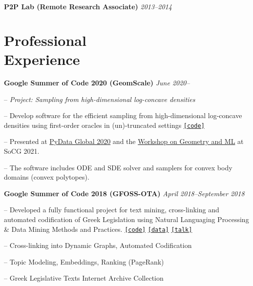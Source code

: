 \documentclass[margin, 10pt]{res}
\newcommand{\field}[2]{\noindent \textbf{#1} \hfill #2 \\}
\newcommand{\specialurl}[2]{\href { #2 } {\nolinkurl{[#1]}}}
\newcommand{\code}[1]{\specialurl {code} {#1}}
\newcommand{\data}[1]{\specialurl {data} {#1}}
\newcommand{\talk}[1]{\specialurl {talk} {#1}}
\begin{document}
\begin{resume}
\textbf{P2P Lab (Remote Research Associate)} \hfill \emph{2013--2014}


 
\section{Professional \\ Experience}
\field{Google Summer of Code 2020 (GeomScale)}  {\emph{June 2020--}}
\begin{compactitem}
\item[--] \emph{Project: Sampling from high-dimensional log-concave densities} 
\item[--] Develop software for the efficient sampling from high-dimensional log-concave densities using first-order oracles in (un)-truncated settings \code{https://GeomScale/volume_approximation}
\item[--] Presented at \href{https://www.youtube.com/watch?v=P7YfC8Nn6sY}{PyData Global 2020} and the \href{https://www.cs.utah.edu/~jeffp/WaGoML/index.html}{Workshop on Geometry and ML} at SoCG 2021. 
\item[--] The software includes ODE and SDE solver and samplers for convex body domains (convex polytopes).
\end{compactitem}

\field{Google Summer of Code 2018 (GFOSS-OTA)}  {\emph{April 2018--September 2018}}
\begin{compactitem}
\item[--] Developed a fully functional project for text mining, cross-linking and automated codification of Greek Legislation using Natural Languaging Processing \& Data Mining Methods and Practices.  \code{https://github.com/eellak/gsoc2018-3gm} \data{https://archive.org/details/greekgovernmentgazette} \talk{https://www.youtube.com/watch?v=_UIGsy85Ehw}

\begin{compactitem}
\item[--] Cross-linking into Dynamic Graphs, Automated Codification
\item[--] Topic Modeling, Embeddings, Ranking (PageRank)
\item[--] Greek Legislative Texts Internet Archive Collection 
\end{compactitem}
\end{compactitem}


\end{resume}
\end{document}
